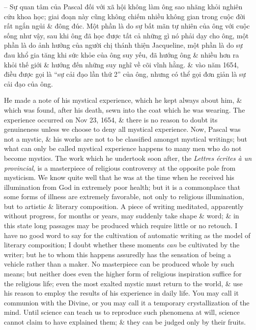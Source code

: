 \documentclass{article}
\begin{document}
\begin{enumerate}
\begin{itemize}
		-- Sự quan tâm của {\sc Pascal} đối với xã hội không làm ông sao nhãng khỏi nghiên cứu khoa học; giai đoạn này cũng không chiếm nhiều không gian trong cuộc đời rất ngắn ngủi \& đông đúc. Một phần là do sự bất mãn tự nhiên của ông với cuộc sống như vậy, sau khi ông đã học được tất cả những gì nó phải dạy cho ông, một phần là do ảnh hưởng của người chị thánh thiện {\sc Jacqueline}, một phần là do sự đau khổ gia tăng khi sức khỏe của ông suy yếu, đã hướng ông \& nhiều hơn ra khỏi thế giới \& hướng đến những suy nghĩ về cõi vĩnh hằng. \& vào năm 1654, điều được gọi là ``sự cải đạo lần thứ 2'' của ông, nhưng có thể gọi đơn giản là sự cải đạo của ông.
		
		He made a note of his mystical experience, which he kept always about him, \& which was found, after his death, sewn into the coat which he was wearing. The experience occurred on Nov 23, 1654, \& there is no reason to doubt its genuineness unless we choose to deny all mystical experience. Now, {\sc Pascal} was not a mystic, \& his works are not to be classified amongst mystical writings; but what can only be called mystical experience happens to many men who do not become mystics. The work which he undertook soon after, the {\it Lettres \'ecrites \`a un provincial}, is a masterpiece of religious controversy at the opposite pole from mysticism. We know quite well that he was at the time when he received his illumination from God in extremely poor health; but it is a commonplace that some forms of illness are extremely favorable, not only to religious illumination, but to artistic \& literary composition. A piece of writing meditated, apparently without progress, for months or years, may suddenly take shape \& word; \& in this state long passages may be produced which require little or no retouch. I have no good word to say for the cultivation of automatic writing as the model of literary composition; I doubt whether these moments {\it can} be cultivated by the writer; but he to whom this happens assuredly has the sensation of being a vehicle rather than a maker. No masterpiece can be produced whole by such means; but neither does even the higher form of religious inspiration suffice for the religious life; even the most exalted mystic must return to the world, \& use his reason to employ the results of his experience in daily life. You may call it communion with the Divine, or you may call it a temporary crystallization of the mind. Until science can teach us to reproduce such phenomena at will, science cannot claim to have explained them; \& they can be judged only by their fruits.
		

\end{itemize}
\end{enumerate}
\end{document}
